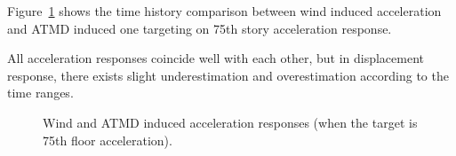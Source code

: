 Figure~\ref{fig:6-11} shows the time history comparison between wind induced acceleration and ATMD induced one targeting on 75th story acceleration response.

All acceleration responses coincide well with each other, but in displacement response, there exists slight underestimation and overestimation according to the time ranges.

\begin{figure}[!ht]
\centering
{}
\caption{Wind and ATMD induced acceleration responses (when the target is 75th floor acceleration).}
\label{fig:6-11}
\end{figure}


